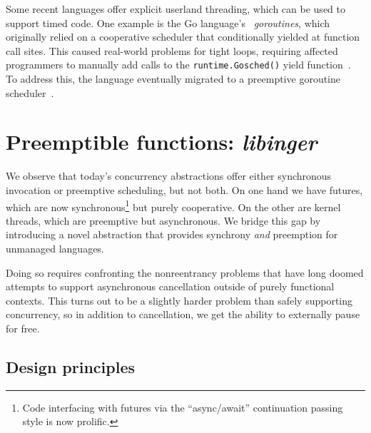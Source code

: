 \begin{swallowsections}
\begin{swallowfigures}

\end{swallowfigures}
\end{swallowsections}




Some recent languages offer explicit userland threading, which can be used to
support timed code.  One example is the Go language's~\cite{www-golang}
\textit{goroutines}, which originally relied on a cooperative scheduler that
conditionally yielded at function call sites.  This caused real-world problems for
tight loops, requiring affected programmers to manually add calls to the
\texttt{runtime.Gosched()} yield function~\cite{www-golang-tightloop}.  To address
this, the language eventually migrated to a preemptive goroutine
scheduler~\cite{www-golang-rel14notes}.




\section{Preemptible functions: \textit{libinger}}

We observe that today's concurrency abstractions offer either synchronous invocation
or preemptive scheduling, but not both.  On one hand we have futures, which are now
synchronous\footnote{Code interfacing with futures via the ``async/await''
continuation passing style is now prolific.} but purely cooperative.  On the other
are kernel threads, which are preemptive but asynchronous.  We bridge this gap by
introducing a novel abstraction that provides synchrony \textit{and} preemption for
unmanaged languages.

Doing so requires confronting the nonreentrancy problems that have long doomed
attempts to support asynchronous cancellation outside of purely functional contexts.
This turns out to be a slightly harder problem than safely supporting concurrency, so
in addition to cancellation, we get the ability to externally pause for free.

\begin{swallowsections}

\end{swallowsections}


\subsection{Design principles}

